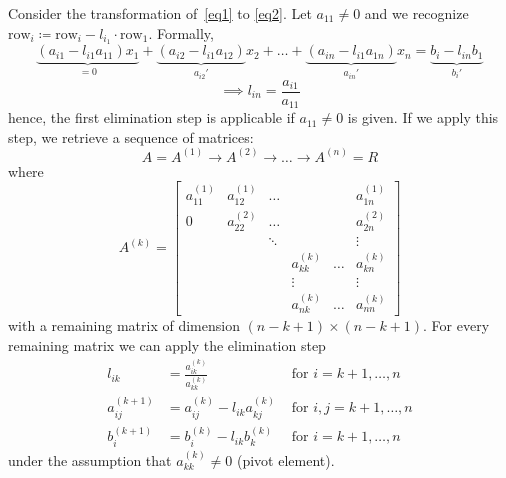 \documentclass[a4paper]{article}
\numberwithin{lecref}{section}
\theoremstyle{break}
\begin{document}
Consider the transformation of~\eqref{eq1} to \eqref{eq2}.
Let $a_{11} \neq 0$ and we recognize $\text{row}_i \coloneqq \text{row}_i - l_{i_1} \cdot \text{row}_1$.
Formally,
\[ \underbrace{(a_{i1} - l_{i1} a_{11}) x_1}_{=0} + \underbrace{(a_{i2} - l_{i1} a_{12})}_{a_{i2}'} x_2 + \dots + \underbrace{(a_{in} - l_{i1} a_{1n})}_{a_{in}'} x_n = \underbrace{b_i - l_{in} b_1}_{b_i'} \]
\[ \implies l_{in} = \frac{a_{i1}}{a_{11}} \]
hence, the first elimination step is applicable if $a_{11} \neq 0$ is given.
If we apply this step, we retrieve a sequence of matrices:
\[ A = A^{(1)} \to A^{(2)} \to \dots \to A^{(n)} = R \]
where
\[
  A^{(k)} = \begin{bmatrix}
    a_{11}^{(1)} & a_{12}^{(1)} & \dots  &              &        & a_{1n}^{(1)} \\
    0            & a_{22}^{(2)} & \dots  &              &        & a_{2n}^{(2)} \\
                 &              & \ddots &              &        & \vdots \\
                 &              &        & a_{kk}^{(k)} & \dots  & a_{kn}^{(k)} \\
                 &              &        & \vdots       &        & \vdots \\
                 &              &        & a_{nk}^{(k)} & \dots  & a_{nn}^{(k)}
  \end{bmatrix}
\]
with a remaining matrix of dimension $(n - k + 1) \times (n - k + 1)$.
For every remaining matrix we can apply the elimination step
\begin{align*}
  l_{ik} &= \frac{a_{ik}^{(k)}}{a_{kk}^{(k)}} &\text{ for } i = k+1, \dots, n \\
  a_{ij}^{(k+1)} &= a_{ij}^{(k)} - l_{ik} a_{kj}^{(k)} &\text{ for } i,j = k+1, \dots, n \\
  b_i^{(k+1)} &= b_i^{(k)} - l_{ik} b_k^{(k)} &\text{ for } i = k+1, \dots, n
\end{align*}
under the assumption that $a_{kk}^{(k)} \neq 0$ (pivot element).
\end{document}
